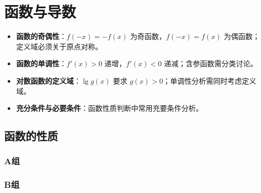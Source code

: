 \chapter{函数与导数}

\begin{knowledgeframe}
\begin{itemize}
	\item \textbf{函数的奇偶性}：$f(-x)=-f(x)$ 为奇函数，$f(-x)=f(x)$ 为偶函数；定义域必须关于原点对称。
	\item \textbf{函数的单调性}：$f'(x)>0$ 递增，$f'(x)<0$ 递减；含参函数需分类讨论。
	\item \textbf{对数函数的定义域}：$\lg g(x)$ 要求 $g(x)>0$；单调性分析需同时考虑定义域。
	\item \textbf{充分条件与必要条件}：函数性质判断中常用充要条件分析。
\end{itemize}
\end{knowledgeframe}

\section{函数的性质}

\startexercise

\subsection*{A组}



\subsection*{B组}



\stopexercise
